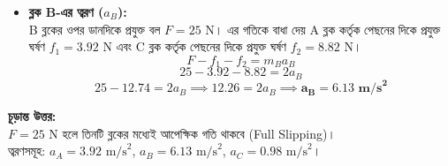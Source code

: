 \documentclass[12pt, a4paper]{article}
\begin{document}
\begin{tcolorbox}[solutionbox={সমাধান (Solution) }]
\begin{itemize}[leftmargin=*, parsep=0.5ex]
    \item \textbf{ব্লক B-এর ত্বরণ ($a_B$):} \\
    B ব্লকের ওপর ডানদিকে প্রযুক্ত বল $F = 25\text{ N}$। এর গতিকে বাধা দেয় A ব্লক কর্তৃক পেছনের দিকে প্রযুক্ত ঘর্ষণ $f_1 = 3.92\text{ N}$ এবং C ব্লক কর্তৃক পেছনের দিকে প্রযুক্ত ঘর্ষণ $f_2 = 8.82\text{ N}$।
    \[ F - f_1 - f_2 = m_B a_B \]
    \[ 25 - 3.92 - 8.82 = 2 a_B \]
    \[ 25 - 12.74 = 2 a_B \implies 12.26 = 2 a_B \implies \mathbf{a_B = 6.13\text{ m/s}^2} \]
\end{itemize}

\vspace{1em}
\begin{tcolorbox}[answerbox]
\textbf{চূড়ান্ত উত্তর:} \\
$F = 25\text{ N}$ হলে তিনটি ব্লকের মধ্যেই আপেক্ষিক গতি থাকবে (Full Slipping)। \\
ত্বরণসমূহ: $a_A = 3.92\text{ m/s}^2$, \quad $a_B = 6.13\text{ m/s}^2$, \quad $a_C = 0.98\text{ m/s}^2$।
\end{tcolorbox}
\end{tcolorbox}
\end{document}
